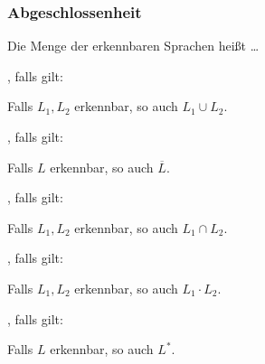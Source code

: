     \begin{frame}
      \frametitle{Abgeschlossenheit}
      
      Die Menge der erkennbaren Sprachen heißt
       \dots
      \begin{Itemize}
        \item
          , falls gilt:
          \par\smallskip
          Falls $L_1,L_2$ erkennbar, so auch $L_1 \cup L_2$.
        \item
          , falls gilt:
          \par\smallskip
          Falls $L$ erkennbar, so auch $\overline{L}$.
        \item
          , falls gilt:
          \par\smallskip
          Falls $L_1,L_2$ erkennbar, so auch $L_1 \cap L_2$.
        \item
          , falls gilt:
          \par\smallskip
          Falls $L_1,L_2$ erkennbar, so auch $L_1 \cdot L_2$.
        \item
          , falls gilt:
          \par\smallskip
          Falls $L$ erkennbar, so auch $L^*$.
      \end{Itemize}


    \end{frame}


